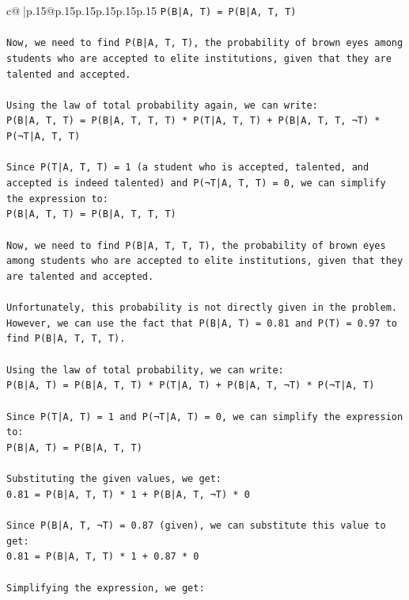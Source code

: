 \documentclass{article}
\begin{document}
{\begin{supertabular}{c@{$\;$}|p{.15\linewidth}@{}p{.15\linewidth}p{.15\linewidth}p{.15\linewidth}p{.15\linewidth}p{.15\linewidth}}
{{{\texttt{P(B|A, T) = P(B|A, T, T)} \\
\\ 
\texttt{Now, we need to find P(B|A, T, T), the probability of brown eyes among students who are accepted to elite institutions, given that they are talented and accepted.} \\
\\ 
\texttt{Using the law of total probability again, we can write:} \\
\texttt{P(B|A, T, T) = P(B|A, T, T, T) * P(T|A, T, T) + P(B|A, T, T, ¬T) * P(¬T|A, T, T)} \\
\\ 
\texttt{Since P(T|A, T, T) = 1 (a student who is accepted, talented, and accepted is indeed talented) and P(¬T|A, T, T) = 0, we can simplify the expression to:} \\
\texttt{P(B|A, T, T) = P(B|A, T, T, T)} \\
\\ 
\texttt{Now, we need to find P(B|A, T, T, T), the probability of brown eyes among students who are accepted to elite institutions, given that they are talented and accepted.} \\
\\ 
\texttt{Unfortunately, this probability is not directly given in the problem. However, we can use the fact that P(B|A, T) = 0.81 and P(T) = 0.97 to find P(B|A, T, T, T).} \\
\\ 
\texttt{Using the law of total probability, we can write:} \\
\texttt{P(B|A, T) = P(B|A, T, T) * P(T|A, T) + P(B|A, T, ¬T) * P(¬T|A, T)} \\
\\ 
\texttt{Since P(T|A, T) = 1 and P(¬T|A, T) = 0, we can simplify the expression to:} \\
\texttt{P(B|A, T) = P(B|A, T, T)} \\
\\ 
\texttt{Substituting the given values, we get:} \\
\texttt{0.81 = P(B|A, T, T) * 1 + P(B|A, T, ¬T) * 0} \\
\\ 
\texttt{Since P(B|A, T, ¬T) = 0.87 (given), we can substitute this value to get:} \\
\texttt{0.81 = P(B|A, T, T) * 1 + 0.87 * 0} \\
\\ 
\texttt{Simplifying the expression, we get:} \\
}}}
\end{supertabular}}
\end{document}
